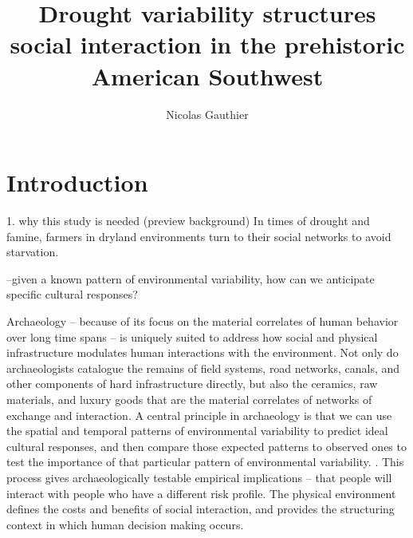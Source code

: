 \documentclass[fleqn,10pt]{wlscirep}
\title{Drought variability structures social interaction in the prehistoric American Southwest}
\author[1,*]{Nicolas Gauthier}
\affil[1]{School of Human Evolution and Social Change, 900 S Caddy Mall, Tempe, USA}
\affil[*]{Nicolas.Gauthier@asu.edu}
\begin{document}
\flushbottom
\maketitle


\thispagestyle{empty}


\section*{Introduction}

1. why this study is needed (preview background)
In times of drought and famine, farmers in dryland environments turn to their social networks to avoid starvation.



--given a known pattern of environmental variability, how can we anticipate specific cultural responses?

Archaeology -- because of its focus on the material correlates of human behavior over long time spans -- is uniquely suited to address how social and physical infrastructure modulates human interactions with the environment. Not only do archaeologists catalogue the remains of field systems, road networks, canals, and other components of hard infrastructure directly, but also the ceramics, raw materials, and luxury goods that are the material correlates of networks of exchange and interaction.
A central principle in archaeology is that we can use the spatial and temporal patterns of environmental variability to predict ideal cultural responses, and then compare those expected patterns to observed ones to test the importance of that particular pattern of environmental variability. \cite{halstead1989}. This process gives archaeologically testable empirical implications -- that people will interact with people who have a different risk profile. The physical environment defines the costs and benefits of social interaction, and provides the structuring context in which human decision making occurs.
\end{document}
